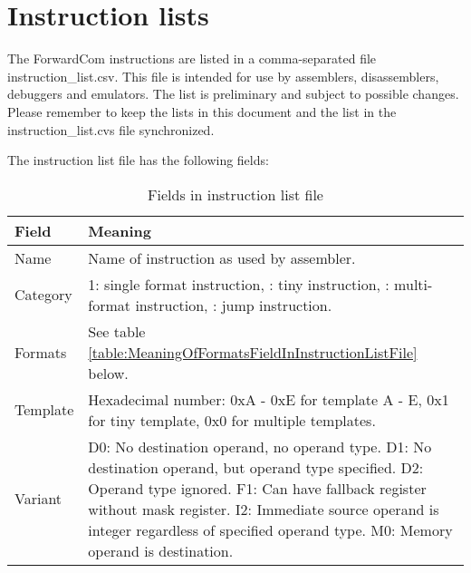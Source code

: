 \documentclass[forwardcom.tex]{subfiles}
\begin{document}
\RaggedRight

\chapter{Instruction lists}
The ForwardCom instructions are listed in a comma-separated file instruction\_list.csv. This file is intended for use by assemblers, disassemblers, debuggers and emulators. The list is preliminary and subject to possible changes. Please remember to keep the lists in this document and the list in the instruction\_list.cvs file synchronized.
\vspace{2mm}

The instruction list file has the following fields:

\begin{longtable} {|p{18mm}|p{100mm}|}
\caption{Fields in instruction list file} 
\label{table:fieldsInInstructionListFile}
\\
\endfirsthead
\endhead
\hline
\bfseries Field & \bfseries Meaning  \\
\hline
Name & Name of instruction as used by assembler.  \\
\hline
Category & 1: single format instruction, \newline
           2: tiny instruction,  \newline
           3: multi-format instruction,  \newline
           4: jump instruction. \\
\hline
Formats & See table \ref{table:MeaningOfFormatsFieldInInstructionListFile} below.  \\
\hline
Template & Hexadecimal number:  \newline
           0xA - 0xE for template A - E,  \newline
           0x1 for tiny template,  \newline
           0x0 for multiple templates. \\
\hline
Variant & 
D0:  No destination operand, no operand type.\newline
D1:  No destination operand, but operand type specified.\newline
D2:  Operand type ignored.\newline
F1:  Can have fallback register without mask register.\newline
I2:  Immediate source operand is integer regardless of specified operand type.\newline
M0:  Memory operand is destination.\newline

\end{longtable}
\end{document}
